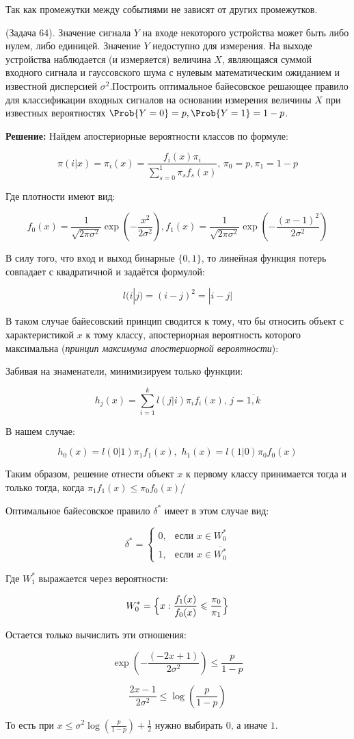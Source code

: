\documentclass[12pt]{article}
\theoremstyle{definiton}
\theoremstyle{definition}
\theoremstyle{definition}
\let\leq\leqslant
\newcounter{problem}
\newcounter{subproblem}
\def\prp{\medskip\noindent\stepcounter{problem}{\bf Задача \theproblem .  }\setcounter{subproblem}{0} }
\begin{document}
Так как промежутки между событиями не зависят от других промежутков.

\prp (Задача 64). Значение сигнала $Y$ на входе некоторого устройства может быть либо нулем, либо единицей. Значение $Y$ недоступно для измерения. На выходе устройства наблюдается (и измеряется) величина $X$, являющаяся суммой входного сигнала и гауссовского шума с нулевым математическим ожиданием и известной дисперсией $\sigma^2$.Построить оптимальное байесовское решающее правило для классификации входных сигналов на основании измерения величины $X$ при известных вероятностях $\Prob\{Y = 0\} = p, \Prob\{Y = 1\} = 1 - p$.

\textbf{Решение: } Найдем апостериорные вероятности классов по формуле:

$$\pi(i|x) = \pi_i(x) = \frac{f_i(x) \pi_i}{\sum\limits_{s=0}^1\pi_s f_s(x)}, \, \pi_0 = p, \pi_1 = 1 - p$$

Где плотности имеют вид:

$$f_0(x) = \frac{1}{\sqrt{2\pi \sigma^2}}\exp{\left(-\frac{x^2}{2\sigma^2}\right)}, f_1(x) = \frac{1}{\sqrt{2\pi \sigma^2}}\exp{\left(-\frac{(x-1)^2}{2\sigma^2}\right)}$$

В силу того, что вход и выход бинарные $\{0,1\}$, то линейная функция потерь совпадает с квадратичной и задаётся формулой:

$$l(i|j) = (i-j)^2 = |i-j|$$

В таком случае байесовский принцип сводится к тому, что бы относить объект с характеристикой $x$ к тому классу, апостериорная вероятность которого максимальна (\textit{принцип максимума апостериорной вероятности}):

Забивая на знаменатели, минимизируем только функции:

$$h_j(x) = \sum\limits_{i=1}^k l(j|i) \pi_i f_i(x), \, j=\overline{1,k}$$

В нашем случае:

$$h_0(x) = l(0|1)\pi_1 f_1(x), \, \, h_1(x) = l(1|0) \pi_0 f_0(x)$$

Таким образом, решение отнести объект $x$ к первому классу принимается тогда и только тогда, когда $\pi_1 f_1(x) \leq \pi_0 f_0(x)$/

Оптимальное байесовское правило $\delta^*$ имеет в этом случае вид:

\[
	\delta^* =
	\begin{cases}
		0, & \text{если $x \in W_0^*$} \\
		1, & \text{если $x \in \overline{W_0^*}$}
	\end{cases}
\]

Где $W_1^*$ выражается через вероятности:

\[
W_0^* = \Bigl\{ x : \frac{f_1(x)}{f_0(x)} \leq \frac{\pi_0}{\pi_1}
\Bigr\}
\]

Остается только вычислить эти отношения:


$$\exp{\left(-\frac{(-2x + 1)}{2\sigma^2}\right)} \leq \frac{p}{1-p} $$

$$\frac{2x - 1}{2\sigma^2} \leq  \log {( \frac{p}{1-p} )} $$ 

То есть при $ x \leq \sigma^2 \log {( \frac{p}{1-p} )} + \frac12$ нужно выбирать $0$, а иначе $1$.
\end{document}
